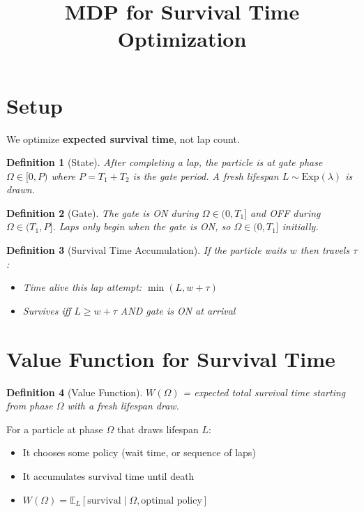 \documentclass{article}
\title{MDP for Survival Time Optimization}
\author{}
\date{}
\newcommand{\E}{\mathbb{E}}
\newtheorem{definition}{Definition}
\begin{document}
\maketitle

\section{Setup}

We optimize \textbf{expected survival time}, not lap count.

\begin{definition}[State]
After completing a lap, the particle is at gate phase $\Omega \in [0, P)$ where $P = T_1 + T_2$ is the gate period. A fresh lifespan $L \sim \text{Exp}(\lambda)$ is drawn.
\end{definition}

\begin{definition}[Gate]
The gate is ON during $\Omega \in (0, T_1]$ and OFF during $\Omega \in (T_1, P]$.
Laps only begin when the gate is ON, so $\Omega \in (0, T_1]$ initially.
\end{definition}

\begin{definition}[Survival Time Accumulation]
If the particle waits $w$ then travels $\tau$:
\begin{itemize}
    \item Time alive this lap attempt: $\min(L, w + \tau)$
    \item Survives iff $L \geq w + \tau$ AND gate is ON at arrival
\end{itemize}
\end{definition}

\section{Value Function for Survival Time}

\begin{definition}[Value Function]
$W(\Omega)$ = expected total survival time starting from phase $\Omega$ with a fresh lifespan draw.
\end{definition}

For a particle at phase $\Omega$ that draws lifespan $L$:
\begin{itemize}
    \item It chooses some policy (wait time, or sequence of laps)
    \item It accumulates survival time until death
    \item $W(\Omega) = \E_L[\text{survival} \mid \Omega, \text{optimal policy}]$
\end{itemize}
\end{document}
